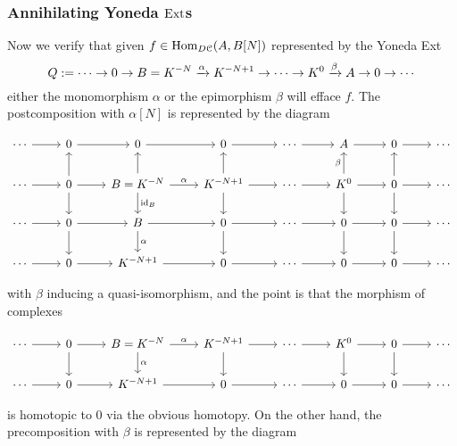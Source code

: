\documentclass[deligne.tex]{subfiles}
\begin{document}
\subsubsection*{Annihilating Yoneda $\operatorname{Ext}$s}\label{sec:killExts}
Now we verify that given $f\in\operatorname{Hom}_{D\mathcal C}(A,B[N])$ represented by 
the Yoneda Ext
\begin{equation*}
	Q:=\cdots\rightarrow0\rightarrow B=K^{-N}\xrightarrow\alpha K^{-N+1}\rightarrow\cdots\rightarrow K^0\xrightarrow\beta A\rightarrow0\rightarrow\cdots
\end{equation*}
either the monomorphism $\alpha$ or the epimorphism $\beta$ will efface 
$f$. The postcomposition with $\alpha[N]$ is represented by the diagram
\begin{ceqn}\begin{equation*}\begin{tikzcd}
	\cdots\arrow[r]&0\arrow[r]&0\arrow[r]
	&0\arrow[r]&\cdots\arrow[r]&A\arrow[r]
	&0\arrow[r]&\cdots \\
	\cdots\arrow[r]&0\arrow[r]\arrow[u]\arrow[d]
	&B=K^{-N}\arrow[r,"\alpha"]\arrow[d,"\id_B"]\arrow[u]
	&K^{-N+1}\arrow[r]\arrow[d]\arrow[u]
	&\cdots\arrow[r]&K^0\arrow[r]\arrow[u,"\beta"]\arrow[d]
	&0\arrow[r]\arrow[d]\arrow[u]&\cdots \\
	\cdots\arrow[r]&0\arrow[r]\arrow[d]
	&B\arrow[r]\arrow[d,"\alpha"]
	&0\arrow[r]\arrow[d]&\cdots\arrow[r]
	&0\arrow[r]\arrow[d]
	&0\arrow[r]\arrow[d]&\cdots \\
	\cdots\arrow[r]&0\arrow[r]&K^{-N+1}\arrow[r]
	&0\arrow[r]&\cdots\arrow[r]&0\arrow[r]
	&0\arrow[r]&\cdots
\end{tikzcd}\end{equation*}\end{ceqn}
with $\beta$ inducing a quasi-isomorphism, and the point is that the
morphism of complexes
\begin{ceqn}\begin{equation*}\begin{tikzcd}
	\cdots\arrow[r]&0\arrow[r]\arrow[d]
	&B=K^{-N}\arrow[r,"\alpha"]\arrow[d,"\alpha"]
	&K^{-N+1}\arrow[r]\arrow[d]
	&\cdots\arrow[r]&K^0\arrow[r]\arrow[d]
	&0\arrow[r]\arrow[d]&\cdots \\
	\cdots\arrow[r]&0\arrow[r]&K^{-N+1}\arrow[r]
	&0\arrow[r]&\cdots\arrow[r]&0\arrow[r]
	&0\arrow[r]&\cdots
\end{tikzcd}\end{equation*}\end{ceqn}
is homotopic to 0 via the obvious homotopy.
On the other hand, the precomposition with $\beta$ is represented by the
diagram
\end{document}
